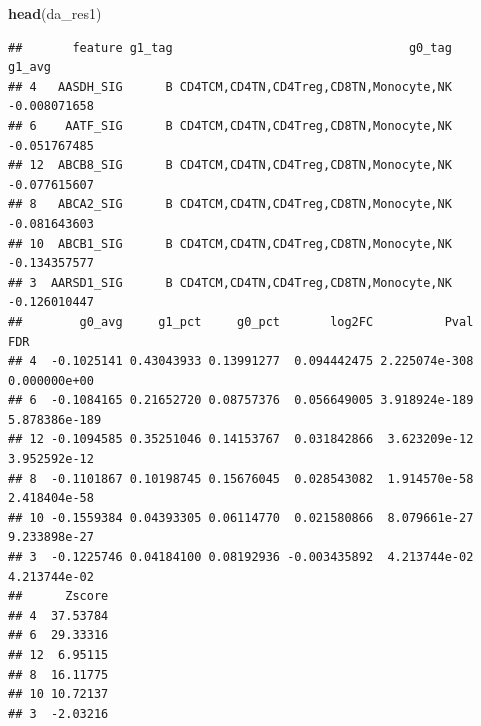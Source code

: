 \documentclass[
  12pt,
]{book}
\newenvironment{Shaded}{\begin{snugshade}}{\end{snugshade}}
\newcommand{\FunctionTok}[1]{\textcolor[rgb]{0.13,0.29,0.53}{\textbf{#1}}}
\newcommand{\NormalTok}[1]{#1}
\begin{document}
\begin{Shaded}
\begin{Highlighting}[]
\FunctionTok{head}\NormalTok{(da\_res1)}
\end{Highlighting}
\end{Shaded}

\begin{verbatim}
##       feature g1_tag                                 g0_tag       g1_avg
## 4   AASDH_SIG      B CD4TCM,CD4TN,CD4Treg,CD8TN,Monocyte,NK -0.008071658
## 6    AATF_SIG      B CD4TCM,CD4TN,CD4Treg,CD8TN,Monocyte,NK -0.051767485
## 12  ABCB8_SIG      B CD4TCM,CD4TN,CD4Treg,CD8TN,Monocyte,NK -0.077615607
## 8   ABCA2_SIG      B CD4TCM,CD4TN,CD4Treg,CD8TN,Monocyte,NK -0.081643603
## 10  ABCB1_SIG      B CD4TCM,CD4TN,CD4Treg,CD8TN,Monocyte,NK -0.134357577
## 3  AARSD1_SIG      B CD4TCM,CD4TN,CD4Treg,CD8TN,Monocyte,NK -0.126010447
##        g0_avg     g1_pct     g0_pct       log2FC          Pval           FDR
## 4  -0.1025141 0.43043933 0.13991277  0.094442475 2.225074e-308  0.000000e+00
## 6  -0.1084165 0.21652720 0.08757376  0.056649005 3.918924e-189 5.878386e-189
## 12 -0.1094585 0.35251046 0.14153767  0.031842866  3.623209e-12  3.952592e-12
## 8  -0.1101867 0.10198745 0.15676045  0.028543082  1.914570e-58  2.418404e-58
## 10 -0.1559384 0.04393305 0.06114770  0.021580866  8.079661e-27  9.233898e-27
## 3  -0.1225746 0.04184100 0.08192936 -0.003435892  4.213744e-02  4.213744e-02
##      Zscore
## 4  37.53784
## 6  29.33316
## 12  6.95115
## 8  16.11775
## 10 10.72137
## 3  -2.03216
\end{verbatim}
\end{document}

